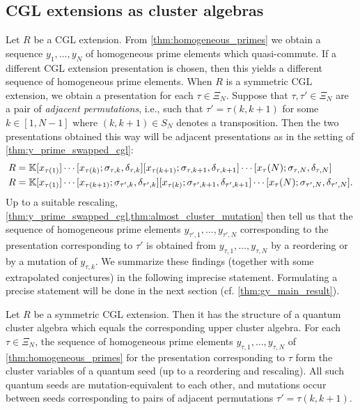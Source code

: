 \subsection{CGL extensions as cluster algebras}

Let $R$ be a CGL extension. From \cref{thm:homogeneous_primes} we obtain a sequence
$y_1, \dots, y_N$ of homogeneous prime elements which quasi-commute. If a different CGL
extension presentation is chosen, then this yields a different sequence of homogeneous
prime elements. When $R$ is a symmetric CGL extension, we obtain a presentation for
each $\tau \in \Xi_N$. Suppose that $\tau, \tau' \in \Xi_N$ are a pair of
\emph{adjacent permutations}, i.e., such that $\tau' = \tau
	(k, k+1)$ for some $k \in [1, N-1]$ where $(k, k+1) \in S_N$ denotes a transposition.
Then the two presentations obtained this way will be adjacent presentations as in the
setting of \cref{thm:y_prime_swapped_cgl}:
\begin{align*}
	 & R = \mathbb{K}[x_{\tau(1)}]\cdots [x_{\tau(k)}; \sigma_{\tau, k}, \delta_{\tau, k}][x_{\tau(k+1)};\sigma_{\tau, k+1}, \delta_{\tau, k+1}] \cdots [x_\tau(N); \sigma_{\tau, N}, \delta_{\tau, N}]        \\
	 & R = \mathbb{K}[x_{\tau(1)}]\cdots [x_{\tau(k+1)}; \sigma_{\tau', k}, \delta_{\tau', k}][x_{\tau(k)};\sigma_{\tau', k+1}, \delta_{\tau', k+1}] \cdots [x_\tau(N); \sigma_{\tau', N}, \delta_{\tau', N}].
\end{align*}
%
Up to a suitable rescaling, \cref{thm:y_prime_swapped_cgl,thm:almost_cluster_mutation}
then tell us that the sequence of homogeneous prime elements $y_{\tau', 1}, \dots,
	y_{\tau', N}$ corresponding to the presentation corresponding to $\tau'$ is obtained
from $y_{\tau, 1}, \dots, y_{\tau, N}$ by a reordering or by a mutation of $y_{\tau,
			k}$. We summarize these findings (together with some extrapolated conjectures) in the
following imprecise statement. Formulating a precise statement will be done in the next
section (cf. \cref{thm:gy_main_result}).

\begin{theorem*}
	Let $R$ be a symmetric CGL extension. Then it has the structure of a quantum cluster
	algebra which equals the corresponding upper cluster algebra. For each $\tau \in
		\Xi_N$, the sequence of homogeneous prime elements $y_{\tau, 1}, \dots, y_{\tau, N}$ of
	\cref{thm:homogeneous_primes} for the presentation corresponding to $\tau$ form the
	cluster variables of a quantum seed (up to a reordering and rescaling). All such
	quantum seeds are mutation-equivalent to each other, and mutations occur between seeds
	corresponding to pairs of adjacent permutations $\tau' = \tau(k, k+1)$.
\end{theorem*}

